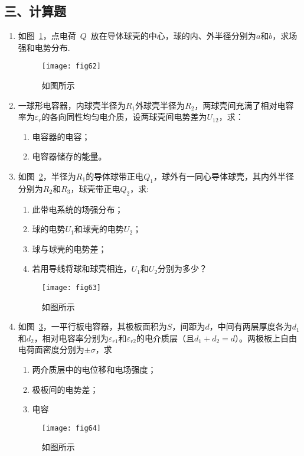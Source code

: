 \subsection*{三、计算题}
\begin{enumerate}
    \item 如图~\ref{fig:62}，点电荷~$Q$~放在导体球壳的中心，球的内、外半径分别为$a$和$b$，求场强和电势分布.
    \begin{figure}[H]
        \centering
        \texttt{[image: fig62]}
        \caption{如图所示}\label{fig:62}
    \end{figure}
    \item 一球形电容器，内球壳半径为$R_1$外球壳半径为$R_2$，两球壳间充满了相对电容率为$\varepsilon_r$的各向同性均匀电介质，设两球壳间电势差为$U_{12}$，求：
    \begin{enumerate}[label=(\arabic*)]
        \item 电容器的电容；
        \item 电容器储存的能量。
    \end{enumerate}
    \item 如图~\ref{fig:63}，半径为$R_1$的导体球带正电$Q_1$，球外有一同心导体球壳，其内外半径分别为$R_2$和$R_3$，球壳带正电$Q_2$，求:
    
    \begin{enumerate}[label=(\arabic*)]
        \item 此带电系统的场强分布；
        \item 球的电势$U_1$和球壳的电势$U_2$；
        \item 球与球壳的电势差；
        \item 若用导线将球和球壳相连，$U_1$和$U_2$分别为多少？
    \end{enumerate}
    \begin{figure}[H]
        \centering
        \texttt{[image: fig63]}
        \caption{如图所示}\label{fig:63}
    \end{figure}
    \item 如图~\ref{fig:64}，一平行板电容器，其极板面积为$S$，间距为$d$，中间有两层厚度各为$d_1$和$d_2$，相对电容率分别为$\varepsilon_{r1}$和$\varepsilon_{r2}$的电介质层（且$d_1+d_2=d$）。两极板上自由电荷面密度分别为$±\sigma$，求
    \begin{enumerate}[label=(\arabic*)]
        \item 两介质层中的电位移和电场强度；
        \item 极板间的电势差；
        \item 电容
    \end{enumerate}
    \begin{figure}[H]
        \centering
        \texttt{[image: fig64]}
        \caption{如图所示}\label{fig:64}
    \end{figure}
\end{enumerate}